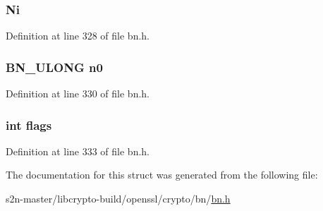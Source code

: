 \subsubsection[{\texorpdfstring{Ni}{Ni}}]{ Ni}\hypertarget{structbn__mont__ctx__st_a40f495d7fe7da52b68a829c6de297bc8}{}\label{structbn__mont__ctx__st_a40f495d7fe7da52b68a829c6de297bc8}


Definition at line 328 of file bn.\+h.

\subsubsection[{\texorpdfstring{n0}{n0}}]{\setlength{\rightskip}{0pt plus 5cm}B\+N\+\_\+\+U\+L\+O\+NG n0}\hypertarget{structbn__mont__ctx__st_a465ab6b2e94695ea60d15169ac9fea9e}{}\label{structbn__mont__ctx__st_a465ab6b2e94695ea60d15169ac9fea9e}


Definition at line 330 of file bn.\+h.

\subsubsection[{\texorpdfstring{flags}{flags}}]{\setlength{\rightskip}{0pt plus 5cm}int flags}\hypertarget{structbn__mont__ctx__st_ac8bf36fe0577cba66bccda3a6f7e80a4}{}\label{structbn__mont__ctx__st_ac8bf36fe0577cba66bccda3a6f7e80a4}


Definition at line 333 of file bn.\+h.



The documentation for this struct was generated from the following file\+:\begin{DoxyCompactItemize}
\item 
s2n-\/master/libcrypto-\/build/openssl/crypto/bn/\hyperlink{crypto_2bn_2bn_8h}{bn.\+h}\end{DoxyCompactItemize}

